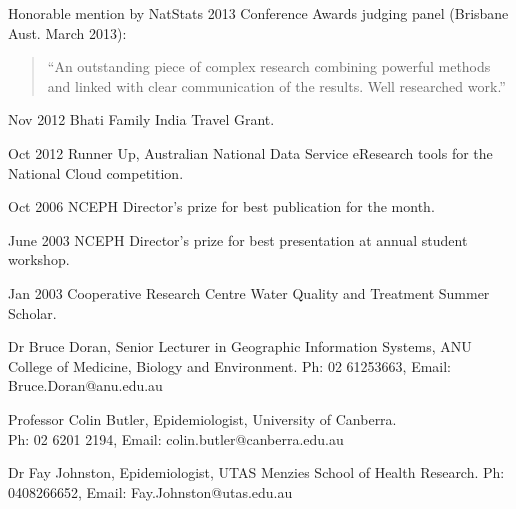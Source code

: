 \documentclass[a4paper,11pt]{article}
\begin{document}
\renewcommand{\labelenumi}{\textsc{n}\theenumi.}
\medskip  
\begin{revnumerate}
\item Honorable mention by NatStats 2013 Conference Awards judging panel (Brisbane Aust. March 2013):

\begin{quote}
“An outstanding piece of complex research combining powerful methods and linked with clear communication of the results. Well researched work.”
\end{quote}

\item Nov 2012 Bhati Family India Travel Grant.

\item Oct 2012 Runner Up, Australian National Data Service eResearch tools for the National Cloud competition.

\item Oct 2006 NCEPH Director’s prize for best publication for the month.

\item June 2003 NCEPH Director’s prize for best presentation at annual student workshop.

\item Jan 2003 Cooperative Research Centre Water Quality and Treatment Summer Scholar.
\end{revnumerate}



\renewcommand{\labelenumi}{\textsc{o}\theenumi.}
\begin{revnumerate}

\item Dr Bruce Doran, Senior Lecturer in Geographic Information Systems, ANU College of Medicine, Biology and Environment. Ph: 02 61253663, Email: Bruce.Doran@anu.edu.au

\item Professor Colin Butler, Epidemiologist, University of Canberra. \\ 
Ph: 02 6201 2194, Email: colin.butler@canberra.edu.au



\item Dr Fay Johnston, Epidemiologist, UTAS Menzies School of Health Research. Ph: 0408266652, Email: Fay.Johnston@utas.edu.au
\end{revnumerate}
\end{document}
